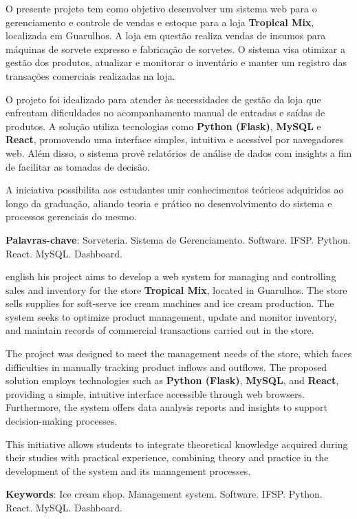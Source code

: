 \begin{resumo}
O presente projeto tem como objetivo desenvolver um sistema web para o gerenciamento e controle de vendas e estoque para a loja \textbf{Tropical Mix}, localizada em Guarulhos. A loja em questão realiza vendas de insumos para máquinas de sorvete expresso e fabricação de sorvetes. O sistema visa otimizar a gestão dos produtos, atualizar e monitorar o inventário e manter um registro das transações comerciais realizadas na loja. 

O projeto foi idealizado para atender às necessidades de gestão da loja que enfrentam dificuldades no acompanhamento manual de entradas e saídas de produtos. A solução utiliza tecnologias como \textbf{Python (Flask)}, \textbf{MySQL} e \textbf{React}, promovendo uma interface simples, intuitiva e acessível por navegadores web. Além disso, o sistema provê relatórios de análise de dados com insights a fim de facilitar as tomadas de decisão.

A iniciativa possibilita aos estudantes unir conhecimentos teóricos adquiridos ao longo da graduação, aliando teoria e prático no desenvolvimento do sistema e processos gerenciais do mesmo.

\vspace{\onelineskip}

\noindent
\textbf{Palavras-chave}: Sorveteria. Sistema de Gerenciamento. Software. IFSP. Python. React. MySQL. Dashboard.
\end{resumo}

\begin{resumo}[Abstract]
\begin{otherlanguage*}{english}
his project aims to develop a web system for managing and controlling sales and inventory for the store \textbf{Tropical Mix}, located in Guarulhos. The store sells supplies for soft-serve ice cream machines and ice cream production. The system seeks to optimize product management, update and monitor inventory, and maintain records of commercial transactions carried out in the store.

The project was designed to meet the management needs of the store, which faces difficulties in manually tracking product inflows and outflows. The proposed solution employs technologies such as \textbf{Python (Flask)}, \textbf{MySQL}, and \textbf{React}, providing a simple, intuitive interface accessible through web browsers. Furthermore, the system offers data analysis reports and insights to support decision-making processes.

This initiative allows students to integrate theoretical knowledge acquired during their studies with practical experience, combining theory and practice in the development of the system and its management processes.

\vspace{\onelineskip}

\noindent
\textbf{Keywords}: Ice cream shop. Management system. Software. IFSP. Python. React. MySQL. Dashboard.
\end{otherlanguage*}
\end{resumo}

